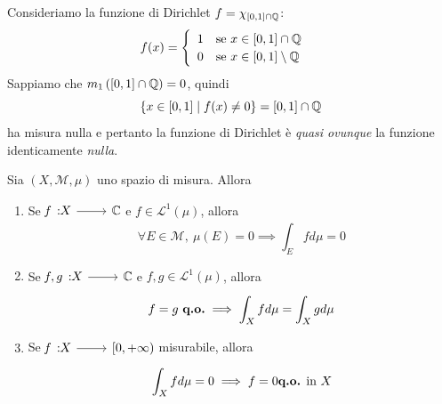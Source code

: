 \begin{example}
	Consideriamo la funzione di Dirichlet $f=\chi_{\left[0,1\right]\cap\mathbb{Q}}$:
	\begin{equation*}
		f(x)=\begin{cases}
			\begin{array}{ll}
				1&\text{se }x\in\left[0,1\right]\cap\mathbb{Q}\\
				0&\text{se }x\in\left[0,1\right]\setminus\mathbb{Q}
			\end{array}
		\end{cases}
	\end{equation*}
Sappiamo che $m_1\left(\left[0,1\right]\cap\mathbb{Q}\right)=0$, quindi
\begin{equation*}
	\left\{x\in\left[0,1\right]\mid f(x)\neq 0\right\}=\left[0,1\right]\cap \mathbb{Q}
\end{equation*}
ha misura nulla e pertanto la funzione di Dirichlet è \textit{quasi ovunque} la funzione identicamente \textit{nulla}.
\end{example}
\begin{property}
Sia $\left(X,\mathcal{M},\mu\right)$ uno spazio di misura. Allora
\begin{enumerate}
	\item Se $\funz{f}{X}{\complexset}$ e $f\in\mathcal{L}^{1}\left(\mu\right)$, allora
	\begin{equation}
		\forall E\in\mathcal{M},\ \mu\left(E\right)=0\implies \int_Efd\mu=0
	\end{equation}
\item Se $\funz{f,g}{X}{\complexset}$ e $f,g\in\mathcal{L}^{1}\left(\mu\right)$, allora
\begin{equation}
	f=g\ \text{\textbf{q.o.}}\implies \int_Xfd\mu=\int_Xgd\mu
\end{equation}
\item Se $\funz{f}{X}{\left[0,+\infty\right)}$ misurabile, allora
\begin{equation}
	\int_X fd\mu=0\implies f=0 \text{\textbf{q.o.} in }X
\end{equation}
\end{enumerate}
\end{property}
